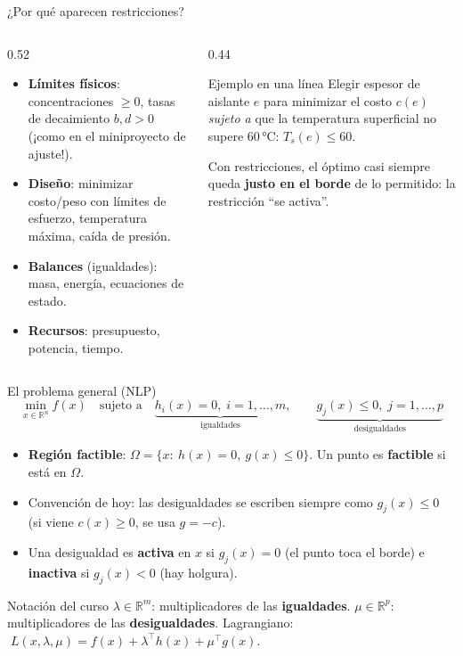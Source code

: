 \documentclass[aspectratio=169]{beamer}
\newcommand{\R}{\mathbb{R}}
\begin{document}
\begin{frame}{¿Por qué aparecen restricciones?}
  \begin{columns}[T]
    \begin{column}{0.52\textwidth}
      \begin{itemize}
        \item \textbf{Límites físicos}: concentraciones $\ge 0$, tasas de decaimiento $b,d>0$ (¡como en el miniproyecto de ajuste!).
        \item \textbf{Diseño}: minimizar costo/peso con límites de esfuerzo, temperatura máxima, caída de presión.
        \item \textbf{Balances} (igualdades): masa, energía, ecuaciones de estado.
        \item \textbf{Recursos}: presupuesto, potencia, tiempo.
      \end{itemize}
    \end{column}
    \begin{column}{0.44\textwidth}
      \begin{block}{Ejemplo en una línea}
        Elegir espesor de aislante $e$ para minimizar el costo $c(e)$ \emph{sujeto a} que la temperatura superficial no supere 60\,°C: $T_s(e)\le 60$.
      \end{block}
      \vspace{0.2cm}
      \small Con restricciones, el óptimo casi siempre queda \textbf{justo en el borde} de lo permitido: la restricción ``se activa''.
    \end{column}
  \end{columns}
\end{frame}

\begin{frame}{El problema general (NLP)}
  \[
    \min_{x\in\R^n} f(x)\quad\text{sujeto a}\quad
    \underbrace{h_i(x)=0,\; i=1,\dots,m}_{\text{igualdades}},\qquad
    \underbrace{g_j(x)\le 0,\; j=1,\dots,p}_{\text{desigualdades}}
  \]
  \begin{itemize}
    \item \textbf{Región factible}: $\Omega=\{x:\ h(x)=0,\ g(x)\le 0\}$. Un punto es \textbf{factible} si está en $\Omega$.
    \item Convención de hoy: las desigualdades se escriben siempre como $g_j(x)\le 0$ (si viene $c(x)\ge 0$, se usa $g=-c$).
    \item Una desigualdad es \textbf{activa} en $x$ si $g_j(x)=0$ (el punto toca el borde) e \textbf{inactiva} si $g_j(x)<0$ (hay holgura).
  \end{itemize}
  \begin{alertblock}{Notación del curso}
    $\lambda\in\R^m$: multiplicadores de las \textbf{igualdades}. $\mu\in\R^p$: multiplicadores de las \textbf{desigualdades}. Lagrangiano: $\;L(x,\lambda,\mu)=f(x)+\lambda^\top h(x)+\mu^\top g(x)$.
  \end{alertblock}
\end{frame}
\end{document}
